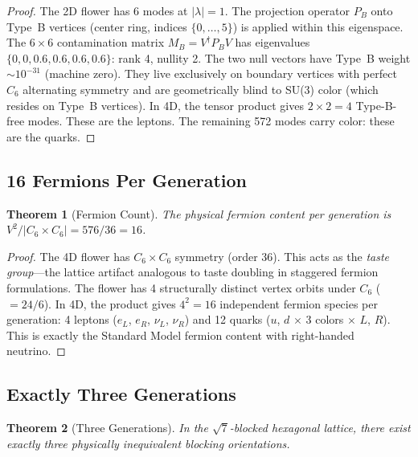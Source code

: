 \documentclass[12pt,a4paper]{article}
\theoremstyle{plain}
\newtheorem{theorem}{Theorem}[section]
\theoremstyle{definition}
\begin{document}
\begin{proof}
The 2D flower has 6 modes at $|\lambda| = 1$. The projection operator $P_B$ onto Type~B vertices (center ring, indices $\{0,\ldots,5\}$) is applied within this eigenspace. The $6 \times 6$ contamination matrix $M_B = V^\dagger P_B V$ has eigenvalues $\{0, 0, 0.6, 0.6, 0.6, 0.6\}$: rank 4, nullity 2. The two null vectors have Type~B weight $\sim 10^{-31}$ (machine zero). They live exclusively on boundary vertices with perfect $C_6$ alternating symmetry and are geometrically blind to SU(3) color (which resides on Type~B vertices). In 4D, the tensor product gives $2 \times 2 = 4$ Type-B-free modes. These are the leptons. The remaining 572 modes carry color: these are the quarks. \qedhere
\end{proof}

\subsection{16 Fermions Per Generation}

\begin{theorem}[Fermion Count]\label{thm:16}
The physical fermion content per generation is $V^2/|C_6 \times C_6| = 576/36 = 16$.
\end{theorem}

\begin{proof}
The 4D flower has $C_6 \times C_6$ symmetry (order 36). This acts as the \emph{taste group}---the lattice artifact analogous to taste doubling in staggered fermion formulations. The flower has 4 structurally distinct vertex orbits under $C_6$ ($= 24/6$). In 4D, the product gives $4^2 = 16$ independent fermion species per generation: 4 leptons ($e_L$, $e_R$, $\nu_L$, $\nu_R$) and 12 quarks ($u$, $d$ $\times$ 3 colors $\times$ $L$, $R$). This is exactly the Standard Model fermion content with right-handed neutrino. \qedhere
\end{proof}

\subsection{Exactly Three Generations}

\begin{theorem}[Three Generations]\label{thm:generations}
In the $\sqrt{7}$-blocked hexagonal lattice, there exist exactly three physically inequivalent blocking orientations.
\end{theorem}
\end{document}
